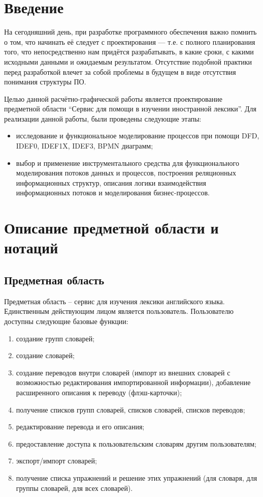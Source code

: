 \documentclass[a4paper,14pt]{extarticle}
\begin{document}


\section*{Введение}
На сегодняшний день, при разработке программного обеспечения важно помнить о
том, что начинать её следует с проектирования — т.е. с полного планирования
того, что непосредственно нам придётся разрабатывать, в какие сроки, с какими
исходными данными и ожидаемым результатом. Отсутствие подобной практики перед
разработкой влечет за собой проблемы в будущем в виде отсутствия понимания
структуры ПО.

Целью данной расчётно-графической работы является проектирование
предметной области \enquote{Сервис для помощи в изучении иностранной лексики}.
Для реализации данной работы, были проведены следующие этапы:
\begin{itemize}
    \item исследование и
          функциональное моделирование процессов при помощи DFD, IDEF0, IDEF1X, IDEF3,
          BPMN диаграмм;
    \item выбор и применение инструментального средства для
          функционального моделирования потоков данных и процессов, построения реляционных
          информационных структур, описания логики взаимодействия информационных потоков и
          моделирования бизнес-процессов.
\end{itemize}

\section{Описание предметной области и нотаций}
\subsection{Предметная область}
Предметная область -- сервис для изучения лексики английского языка.
Единственным действующим лицом является пользователь. Пользователю доступны
следующие базовые функции:
\begin{enumerate}
    \item создание групп словарей;
    \item создание словарей;
    \item создание переводов внутри словарей (импорт из внешних словарей с
          возможностью редактирования импортированной информации), добавление
          расширенного описания к переводу (флэш-карточки);
    \item получение списков групп словарей, списков словарей, списков переводов;
    \item редактирование перевода и его описания;
    \item предоставление доступа к пользовательским словарям другим пользователям;
    \item экспорт/импорт словарей;
    \item получение списка упражнений и решение этих упражнений (для словаря,
          для группы словарей, для всех словарей).
\end{enumerate}
\end{document}
